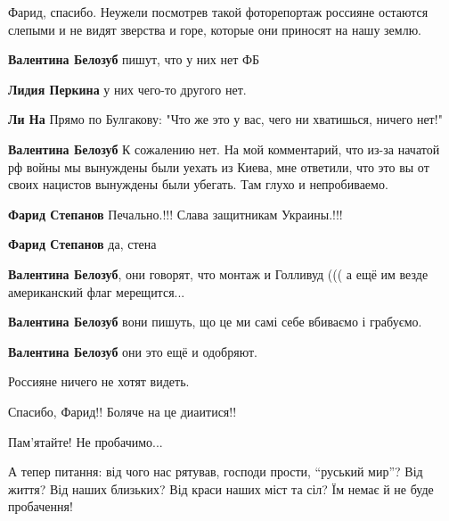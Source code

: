  
 
 
 
 
\zzSecCmt

\begin{itemize} %

Фарид, спасибо. Неужели посмотрев такой фоторепортаж россияне остаются слепыми и
не видят зверства и горе, которые они приносят на нашу землю.

\begin{itemize} %
\textbf{Валентина Белозуб} пишут, что у них нет ФБ

\textbf{Лидия Перкина} у них чего-то другого нет.

\textbf{Ли На}
Прямо по Булгакову: "Что же это у вас, чего ни хватишься, ничего нет!"

\textbf{Валентина Белозуб}
К сожалению нет.
На мой комментарий, что из-за начатой рф войны мы вынуждены были уехать из Киева, мне ответили, что это вы от своих нацистов вынуждены были убегать.
Там глухо и непробиваемо.

\textbf{Фарид Степанов} Печально.!!! Слава защитникам Украины.!!!

\textbf{Фарид Степанов} да, стена

\textbf{Валентина Белозуб}, они говорят, что монтаж и Голливуд ((( а ещё им везде американский флаг мерещится...

\textbf{Валентина Белозуб} вони пишуть, що це ми самі себе вбиваємо і грабуємо.

\textbf{Валентина Белозуб} они это ещё и одобряют.
\end{itemize} %

Россияне ничего не хотят видеть.

Спасибо, Фарид!! Боляче на це диаитися!!

Пам'ятайте!
Не пробачимо...


А тепер питання: від чого нас рятував, господи прости, \enquote{руський мир}? Від
життя? Від наших близьких? Від краси наших міст та сіл? Їм немає й не буде
пробачення!


\end{itemize}
